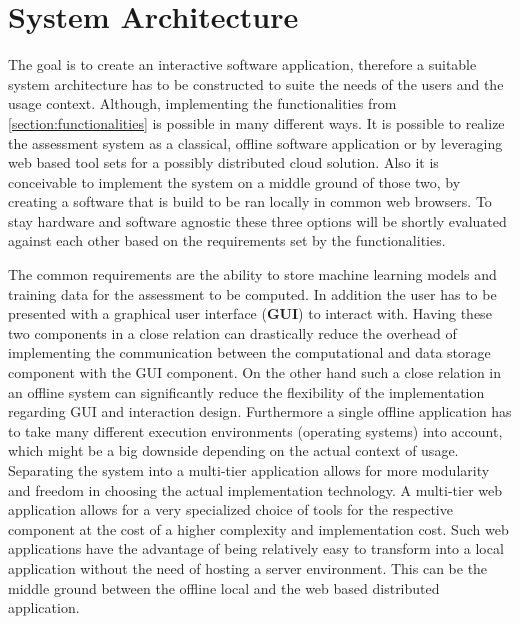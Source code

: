 \documentclass[11pt,a4paper,english]{scrreprt}
\begin{document}
\section{System Architecture}\label{section:system_architecture}
The goal is to create an interactive software application, therefore a suitable system architecture has to be constructed to suite the needs of the users and the usage context. Although, implementing the functionalities from \autoref{section:functionalities} is possible in many different ways. It is possible to realize the assessment system as a classical, offline software application or by leveraging web based tool sets for a possibly distributed cloud solution. Also it is conceivable to implement the system on a middle ground of those two, by creating a software that is build to be ran locally in common web browsers. To stay hardware and software agnostic these three options will be shortly evaluated against each other based on the requirements set by the functionalities.

The common requirements are the ability to store machine learning models and training data for the assessment to be computed. In addition the user has to be presented with a graphical user interface (\textbf{GUI}) to interact with. Having these two components in a close relation can drastically reduce the overhead of implementing the communication between the computational and data storage component with the GUI component. On the other hand such a close relation in an offline system can significantly reduce the flexibility of the implementation regarding GUI and interaction design. Furthermore a single offline application has to take many different execution environments (operating systems) into account, which might be a big downside depending on the actual context of usage. Separating the system into a multi-tier application allows for more modularity and freedom in choosing the actual implementation technology. A multi-tier web application allows for a very specialized choice of tools for the respective component at the cost of a higher complexity and implementation cost. Such web applications have the advantage of being relatively easy to transform into a local application without the need of hosting a server environment. This can be the middle ground between the offline local and the web based distributed application.
\end{document}
